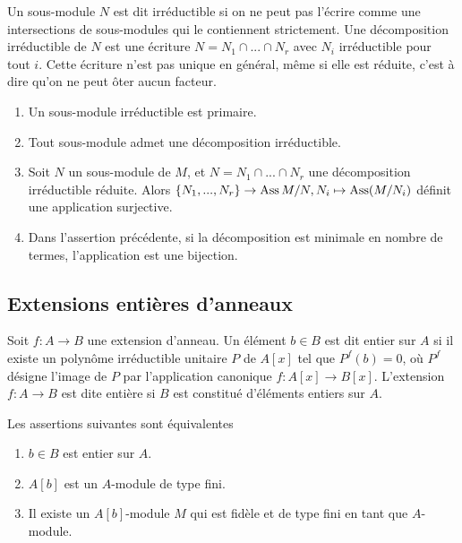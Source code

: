 Un sous-module $N$ est dit irréductible si on ne peut pas l'écrire comme une intersections de sous-modules qui le contiennent strictement. Une décomposition irréductible de $N$ est une écriture $N=N_1\cap...\cap N_r$ avec $N_i$ irréductible pour tout $i$. Cette écriture n'est pas unique en général, même si elle est réduite, c'est à dire qu'on ne peut ôter aucun facteur. 

\begin{thm}
\begin{enumerate}
\item Un sous-module irréductible est primaire.
\item Tout sous-module admet une décomposition irréductible.
\item Soit $N$ un sous-module de $M$, et $N=N_1\cap...\cap N_r$ une décomposition irréductible réduite. Alors $\lbrace N_1,...,N_r\rbrace\rightarrow \operatorname{Ass} M/N, N_i\mapsto \operatorname{Ass}(M/N_i)$ définit une application surjective.
\item Dans l'assertion précédente, si la décomposition est minimale en nombre de termes, l'application est une bijection.
\end{enumerate}
\end{thm}

\subsection{Extensions entières d'anneaux}

Soit $f:A\rightarrow B$ une extension d'anneau. Un élément $b\in B$ est dit entier sur $A$ si il existe un polynôme irréductible unitaire $P$ de $A[x]$ tel que $P^f(b)=0$, où $P^f$ désigne l'image de $P$ par l'application canonique $f:A[x]\rightarrow B[x]$. L'extension $f:A\rightarrow B$ est dite entière si $B$ est constitué d'éléments entiers sur $A$.

\begin{prop}
Les assertions suivantes sont équivalentes
\begin{enumerate}
\item $b\in B$ est entier sur $A$.
\item $A[b]$ est un $A$-module de type fini.
\item Il existe un $A[b]$-module $M$ qui est fidèle et de type fini en tant que $A$-module.
\end{enumerate}
\end{prop}

